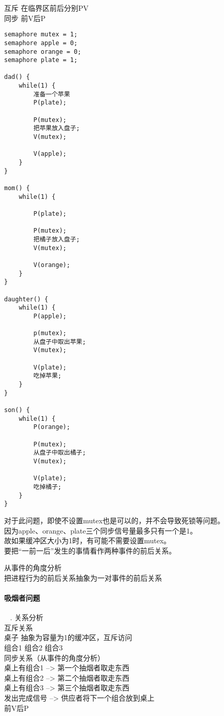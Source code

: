 \noindent
互斥 在临界区前后分别PV \\
同步 前V后P \\

\begin{lstlisting}
semaphore mutex = 1;
semaphore apple = 0;
semaphore orange = 0;
semaphore plate = 1;

dad() {
	while(1) {
		准备一个苹果
		P(plate);
		
		P(mutex);
		把苹果放入盘子;
		V(mutex);
		
		V(apple);
	}
}

mom() {
	while(1) {
	
		P(plate);
		
		P(mutex);
		把橘子放入盘子;
		V(mutex);
		
		V(orange);
	}
}

daughter() {
	while(1) {
		P(apple);

		p(mutex);
		从盘子中取出苹果;
		V(mutex);
		
		V(plate);
		吃掉苹果;
	}
}

son() {
	while(1) {
		P(orange);
		
		P(mutex);
		从盘子中取出橘子;
		V(mutex);
		
		V(plate);
		吃掉橘子;
	}
}
\end{lstlisting}
\noindent
对于此问题，即使不设置mutex也是可以的，并不会导致死锁等问题。 \\
因为apple、orange、plate三个同步信号量最多只有一个是1。 \\
故如果缓冲区大小为1时，有可能不需要设置mutex。 \\

\noindent
要把“一前一后”发生的事情看作两种事件的前后关系。

\noindent
从事件的角度分析 \\
把进程行为的前后关系抽象为一对事件的前后关系 \\

\paragraph{吸烟者问题}~{}
\newline {}. 关系分析 \\
互斥关系 \\
桌子 抽象为容量为1的缓冲区，互斥访问 \\
组合1 \space 组合2 \space 组合3 \\ 

\noindent
同步关系（从事件的角度分析） \\
桌上有组合1 --> 第一个抽烟者取走东西 \\
桌上有组合2 --> 第二个抽烟者取走东西 \\
桌上有组合3 --> 第三个抽烟者取走东西 \\
发出完成信号 --> 供应者将下一个组合放到桌上 \\
前V后P \\

